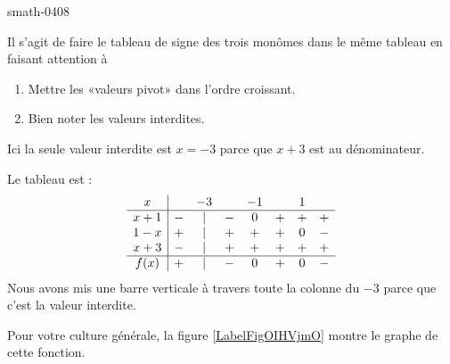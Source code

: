 
\begin{corrige}{smath-0408}

    Il s'agit de faire le tableau de signe des trois monômes dans le même tableau en faisant attention à
    \begin{enumerate}
        \item
            Mettre les «valeurs pivot» dans l'ordre croissant.
        \item
            Bien noter les valeurs interdites.
    \end{enumerate}
    Ici la seule valeur interdite est \( x=-3\) parce que \( x+3\) est au dénominateur.

    Le tableau est :
    \begin{equation*}
        \begin{array}[]{c|ccccccc}
            x&&-3&&-1&&1&\\
            \hline
            x+1&-&|&-&0&+&+&+\\
            1-x&+&|&+&+&+&0&-\\
            x+3&-&|&+&+&+&+&+\\
            \hline
            f(x)&+&|&-&0&+&0&-\\
        \end{array}
    \end{equation*}
    Nous avons mis une barre verticale à travers toute la colonne du \( -3\) parce que c'est la valeur interdite.

    Pour votre culture générale, la figure \ref{LabelFigOIHVjmO} montre le graphe de cette fonction. 

\newcommand{\CaptionFigOIHVjmO}{La fonction dont on étudie le signe dans l'exercice \ref{exosmath-0408}.}


\end{corrige}
